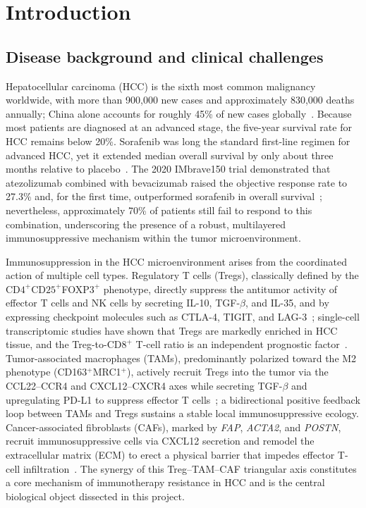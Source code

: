 \documentclass[12pt, a4paper]{article}
\begin{document}
\section{Introduction}

\subsection{Disease background and clinical challenges}

Hepatocellular carcinoma (HCC) is the sixth most common malignancy worldwide, with more than 900,000 new cases and approximately 830,000 deaths annually; China alone accounts for roughly 45\% of new cases globally~\citep{llovet2021hepatocellular,chen2016liver}. Because most patients are diagnosed at an advanced stage, the five-year survival rate for HCC remains below 20\%. Sorafenib was long the standard first-line regimen for advanced HCC, yet it extended median overall survival by only about three months relative to placebo~\citep{llovet2008sorafenib}. The 2020 IMbrave150 trial demonstrated that atezolizumab combined with bevacizumab raised the objective response rate to 27.3\% and, for the first time, outperformed sorafenib in overall survival~\citep{finn2020atezolizumab}; nevertheless, approximately 70\% of patients still fail to respond to this combination, underscoring the presence of a robust, multilayered immunosuppressive mechanism within the tumor microenvironment.

Immunosuppression in the HCC microenvironment arises from the coordinated action of multiple cell types. Regulatory T cells (Tregs), classically defined by the CD$4^+$CD$25^+$FOXP$3^+$ phenotype, directly suppress the antitumor activity of effector T cells and NK cells by secreting IL-10, TGF-$\beta$, and IL-35, and by expressing checkpoint molecules such as CTLA-4, TIGIT, and LAG-3~\citep{sakaguchi2020regulatory}; single-cell transcriptomic studies have shown that Tregs are markedly enriched in HCC tissue, and the Treg-to-CD$8^+$ T-cell ratio is an independent prognostic factor~\citep{zheng2017landscape}. Tumor-associated macrophages (TAMs), predominantly polarized toward the M2 phenotype (CD163$^+$MRC1$^+$), actively recruit Tregs into the tumor via the CCL22--CCR4 and CXCL12--CXCR4 axes while secreting TGF-$\beta$ and upregulating PD-L1 to suppress effector T cells~\citep{biswas2010macrophage,noy2014tumor}; a bidirectional positive feedback loop between TAMs and Tregs sustains a stable local immunosuppressive ecology. Cancer-associated fibroblasts (CAFs), marked by \textit{FAP}, \textit{ACTA2}, and \textit{POSTN}, recruit immunosuppressive cells via CXCL12 secretion and remodel the extracellular matrix (ECM) to erect a physical barrier that impedes effector T-cell infiltration~\citep{kalluri2016biology,mariathasan2018tgfb}. The synergy of this Treg--TAM--CAF triangular axis constitutes a core mechanism of immunotherapy resistance in HCC and is the central biological object dissected in this project.
\end{document}
